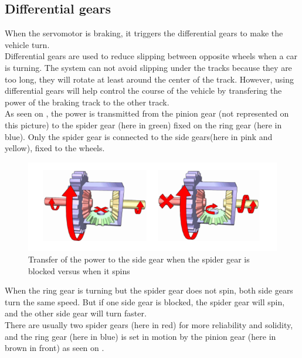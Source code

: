\subsection{Differential gears} \label{sec:Differentialgears}

When the servomotor is braking, it triggers the differential gears to make the vehicle turn.\\
Differential gears are used to reduce slipping between opposite wheels when a car is turning. The system can not avoid slipping under the tracks because they are too long, they will rotate at least around the center of the track. However, using differential gears will help control the course of the vehicle by transfering the power of the braking track to the other track.\\

As seen on , the power is transmitted from the pinion gear (not represented on this picture) to the spider gear (here in green) fixed on the ring gear (here in blue). Only the spider gear is connected to the side gears(here in pink and yellow), fixed to the wheels.\\

\begin{figure}[H]
	\centering
	\includegraphics[scale=0.7]{figures/diffGearLight}
	\caption{Transfer of the power to the side gear when the spider gear is blocked versus when it spins \cite{MechanicalEngineering}}
	\label{diffGearLight}
\end{figure}

When the ring gear is turning but the spider gear does not spin, both side gears turn the same speed. But if one side gear is blocked, the spider gear will spin,  and the other side gear will turn faster.\\

There are usually two spider gears (here in red) for more reliability and solidity, and the ring gear (here in blue) is set in motion by the pinion gear (here in brown in front) as seen on .\\

